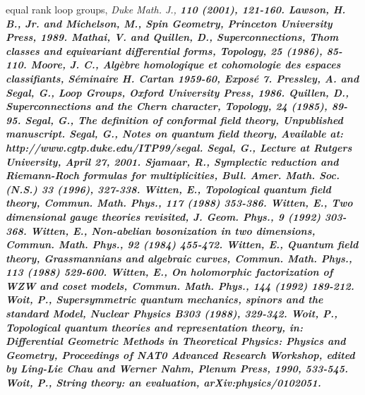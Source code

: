 \documentclass[a4paper,a4paper]{article}
\theoremstyle{conjecture}
\begin{document}
\begin{thebibliography}{99}
equal rank loop groups,
\it Duke Math. J.,
\bf 110
\rm (2001), 121-160.
\rm Lawson, H. B., Jr. and Michelson, M.,
\it Spin Geometry,
\rm Princeton University Press, 1989.
\rm Mathai, V. and Quillen, D.,
\rm Superconnections, Thom classes and equivariant differential forms,
\it Topology,
\bf 25
\rm (1986), 85-110.
\rm Moore, J. C., \rm Alg\`ebre homologique et cohomologie des
espaces classifiants, \it S\'eminaire H. Cartan 1959-60,
Expos\'e 7. \rm
{}
\rm Pressley, A. and Segal, G.,
\it Loop Groups,
\rm Oxford University Press, 1986.
\rm Quillen, D.,
\rm Superconnections and the Chern character,
\it Topology,
\bf 24
\rm (1985), 89-95.
\rm Segal, G.,
\it The definition of conformal field theory,
\rm Unpublished manuscript.
\rm Segal, G.,
\it Notes on quantum field theory,
\rm Available at: http://www.cgtp.duke.edu/ITP99/segal.
\rm Segal, G.,
\it Lecture at Rutgers University, April 27, 2001.\rm
{}
\rm Sjamaar, R.,
\rm Symplectic reduction and Riemann-Roch formulas for multiplicities,
\it Bull. Amer. Math. Soc. (N.S.)
\bf 33
\rm (1996), 327-338.
\rm Witten, E.,
\rm Topological quantum field theory,
\it Commun. Math. Phys.,
\bf 117
\rm (1988) 353-386.
\rm Witten, E.,
\rm Two dimensional gauge theories revisited,
\it J. Geom. Phys.,
\bf 9
\rm (1992) 303-368.
\rm Witten, E.,
\rm Non-abelian bosonization in two dimensions,
\it Commun. Math. Phys.,
\bf 92
\rm (1984) 455-472.
\rm Witten, E.,
\rm Quantum field theory, Grassmannians and algebraic curves,
\it Commun. Math. Phys.,
\bf 113
\rm (1988) 529-600.
\rm Witten, E.,
\rm On holomorphic factorization of WZW and coset models,
\it Commun. Math. Phys.,
\bf 144
\rm (1992) 189-212.
\rm Woit, P.,
\rm Supersymmetric quantum mechanics, spinors and the standard Model,
\it Nuclear Physics
\bf B303
\rm (1988), 329-342.
\rm Woit, P.,
\rm Topological quantum theories and representation theory, in:
\it Differential Geometric Methods in Theoretical Physics: Physics and Geometry,
Proceedings of NAT0 Advanced Research Workshop, edited by Ling-Lie Chau and Werner Nahm,
\rm Plenum Press, 1990, 533-545.
\rm Woit, P.,
\rm String theory: an evaluation,
\rm arXiv:physics/0102051.
\end{thebibliography}
\end{document}
